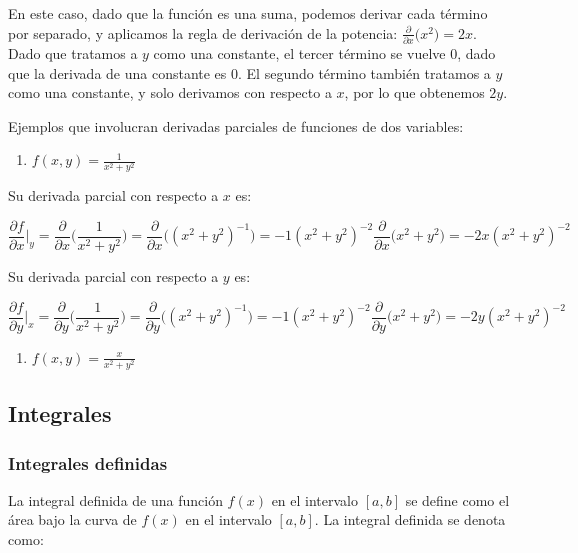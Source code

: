 \documentclass[11pt]{article}
\providecommand{\tightlist}{%
      \setlength{\itemsep}{0pt}\setlength{\parskip}{0pt}}
\begin{document}
En este caso, dado que la función es una suma, podemos derivar cada
término por separado, y aplicamos la regla de derivación de la potencia:
\(\frac{\partial}{\partial x} \Big( x^2 \Big) = 2x\). Dado que tratamos
a \(y\) como una constante, el tercer término se vuelve 0, dado que la
derivada de una constante es 0. El segundo término también tratamos a
\(y\) como una constante, y solo derivamos con respecto a \(x\), por lo
que obtenemos \(2y\).

Ejemplos que involucran derivadas parciales de funciones de dos
variables:

\begin{enumerate}
\def\labelenumi{\arabic{enumi}.}
\setcounter{enumi}{1}
\tightlist
\item
  \(f(x,y) = \frac{1}{x^2 + y^2}\)
\end{enumerate}

Su derivada parcial con respecto a \(x\) es:

\[
\frac{\partial f}{\partial x} \Big|_{y} = \frac{\partial}{\partial x} \Big( \frac{1}{x^2 + y^2} \Big) = \frac{\partial}{\partial x} \Big( (x^2 + y^2)^{-1} \Big) = -1 (x^2 + y^2)^{-2} \frac{\partial}{\partial x} \Big( x^2 + y^2 \Big) = -2x (x^2 + y^2)^{-2}
\]

Su derivada parcial con respecto a \(y\) es:

\[
\frac{\partial f}{\partial y} \Big|_{x} = \frac{\partial}{\partial y} \Big( \frac{1}{x^2 + y^2} \Big) = \frac{\partial}{\partial y} \Big( (x^2 + y^2)^{-1} \Big) = -1 (x^2 + y^2)^{-2} \frac{\partial}{\partial y} \Big( x^2 + y^2 \Big) = -2y (x^2 + y^2)^{-2}
\]

\begin{enumerate}
\def\labelenumi{\arabic{enumi}.}
\setcounter{enumi}{2}
\tightlist
\item
  \(f(x,y) = \frac{x}{x^2 + y^2}\)
\end{enumerate}

    \hypertarget{integrales}{%
\subsection{Integrales}\label{integrales}}

\hypertarget{integrales-definidas}{%
\subsubsection{Integrales definidas}\label{integrales-definidas}}

La integral definida de una función \(f(x)\) en el intervalo \([a,b]\)
se define como el área bajo la curva de \(f(x)\) en el intervalo
\([a,b]\). La integral definida se denota como:
\end{document}
